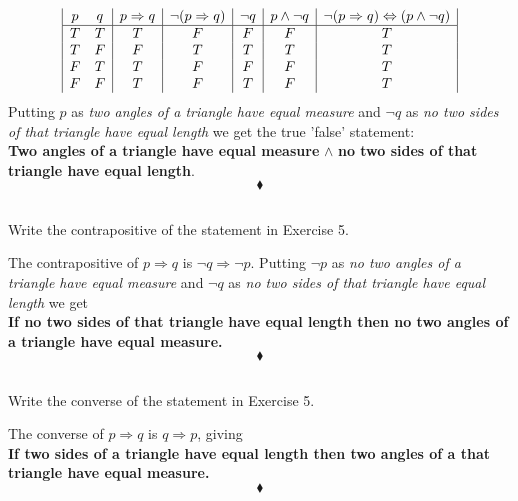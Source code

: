 \begin{displaymath}
\begin{array}{|c c|c|c | c|c| c|}

p & q &p\Rightarrow q& \lnot(p\Rightarrow q)&\lnot q&p \wedge \lnot q &\lnot(p\Rightarrow q)\Leftrightarrow (p \wedge \lnot q)\\ %
\hline %
T & T & T&F&F&F&T\\
T & F & F&T&T&T&T\\
F & T & T&F&F&F&T\\
F & F & T&F&T&F&T\\
\end{array}
\end{displaymath}
Putting $p$ as \textit{two angles of a triangle have equal measure} and $\lnot q$ as \textit{no two sides of that triangle have equal length} we get the true 'false' statement:\\
\textbf{Two angles of a triangle have equal measure} $\wedge$  \textbf{no two sides of that triangle have equal length}. 
$$\blacklozenge$$

\subsection{}
\begin{tcolorbox}
Write the contrapositive of the statement in Exercise 5.
\end{tcolorbox}
The contrapositive of $p\Rightarrow q$ is $\lnot q\Rightarrow \lnot p$.
Putting $\lnot p$ as \textit{no two angles of a triangle have equal measure} and $\lnot q$ as \textit{no two sides of that triangle have equal length} we get \\
\textbf{If no two sides of that triangle have equal length then no two angles of a triangle have equal measure.}
$$\blacklozenge$$

\subsection{}
\begin{tcolorbox}
Write the converse of the statement in Exercise 5.
\end{tcolorbox}
The converse of $p\Rightarrow q$ is $q\Rightarrow  p$,  giving \\
\textbf{If two sides of a triangle have equal length then  two angles of a that triangle have equal measure.}
$$\blacklozenge$$

